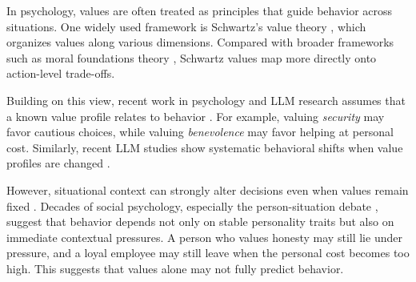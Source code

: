 \documentclass[11pt]{article}
\begin{document}
In psychology, values are often treated as principles that guide behavior across situations. One widely used framework is Schwartz’s value theory \citep{schwartz2012refined}, which organizes values along various dimensions. 
Compared with broader frameworks such as moral foundations theory \citep{haidt2012righteous}, Schwartz values map more directly onto action-level trade-offs.

Building on this view, recent work in psychology and LLM research assumes that a known value profile relates to behavior \citep{jiao2025ai, backmann2025ethics}. For example, valuing \textit{security} may favor cautious choices, while valuing \textit{benevolence} may favor helping at personal cost. Similarly, recent LLM studies show systematic behavioral shifts when value profiles are changed \citep{sauter2026between, guo2026counterfactual}.

However, situational context can strongly alter decisions even when values remain fixed \citep{nabizadeh2026large, sauter2026between, harry2026beyond, backmann2025ethics}. Decades of social psychology, especially the person-situation debate \citep{harry2026beyond, soni2025we, peterson2025context}, suggest that behavior depends not only on stable personality traits but also on immediate contextual pressures. A person who values honesty may still lie under pressure, and a loyal employee may still leave when the personal cost becomes too high. This suggests that values alone may not fully predict behavior.


\end{document}
